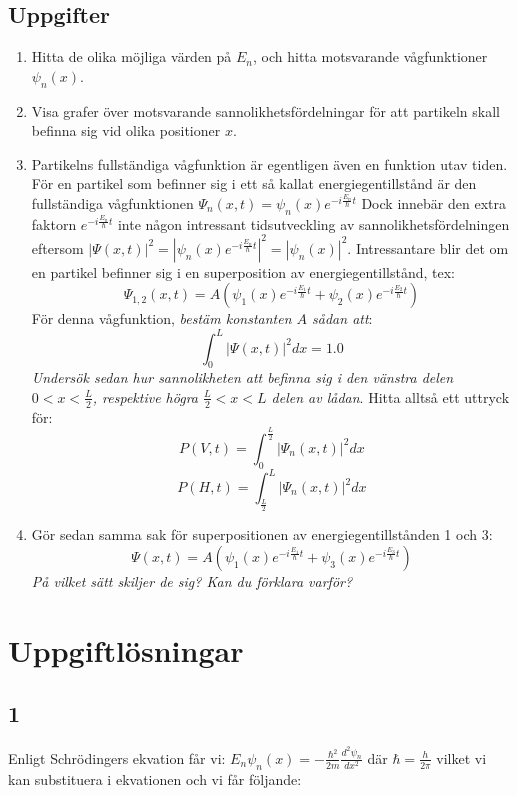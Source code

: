 \documentclass{article}
\newcommand{\wavefun}{\psi_n(x)}
\newcommand{\shrodequ}{E_n \psi_n(x) = - \frac{\hbar^2}{2m} \frac{d^2 \psi_n}{dx^2}}
\newcommand{\shrodprob}{|\psi_n(x)|^2}
\newcommand{\shrodtime}{e^{-i \frac{E_n}{\hbar} t}}
\newcommand{\fullshrodequ}{\Psi_n(x, t) = \psi_n(x) \shrodtime}
\newcommand{\fullshrodprob}{|\Psi_n(x,t)|^2}
\begin{document}
\subsection{Uppgifter}
\begin{enumerate}
	\item Hitta de olika möjliga värden på $E_n$, och hitta motsvarande vågfunktioner $\wavefun$. 
	\item Visa grafer över motsvarande sannolikhetsfördelningar för att partikeln skall befinna sig vid olika positioner $x$.

	\item Partikelns fullständiga vågfunktion är egentligen även en funktion utav tiden. För en partikel som befinner sig i ett så kallat energiegentillstånd är den fullständiga vågfunktionen $\fullshrodequ$
		Dock innebär den extra faktorn $\shrodtime$ inte någon intressant tidsutveckling av sannolikhetsfördelningen eftersom $|\Psi(x, t)|^2 = |\psi_n(x) \shrodtime|^2 = \shrodprob$. Intressantare blir det om en partikel befinner sig i en superposition av energiegentillstånd, tex: $$\Psi_{1, 2}(x, t) = A(\psi_1(x)e^{-i \frac{E_1}{\hbar}t} + \psi_2(x) e^{-i \frac{E_2}{\hbar}t})$$ För denna vågfunktion, \emph{bestäm konstanten $A$ sådan att}: $$\int_0^L |\Psi(x, t)|^2 dx = 1.0$$ \emph{Undersök sedan hur sannolikheten att befinna sig i den vänstra delen $0 < x < \frac{L}{2}$, respektive högra $\frac{L}{2} < x < L$ delen av lådan}. Hitta alltså ett uttryck för: $$P(V, t) = \int_0^{\frac{L}{2}} \fullshrodprob dx$$ $$P(H, t) = \int_{\frac{L}{2}}^L \fullshrodprob dx$$

	\item Gör sedan samma sak för superpositionen av energiegentillstånden 1 och 3: $$\Psi(x, t) = A\left(\psi_1(x)e^{-i \frac{E_1}{\hbar}t} + \psi_3(x)e^{-i \frac{E_3}{\hbar}t}\right)$$ \emph{På vilket sätt skiljer de sig? Kan du förklara varför?}
\end{enumerate}

\newpage

\section{Uppgiftlösningar}
\subsection{1}

Enligt Schrödingers ekvation får vi: $\shrodequ$ där $\hbar = \frac{h}{2\pi}$ vilket vi kan substituera i ekvationen och vi får följande:
\end{document}
